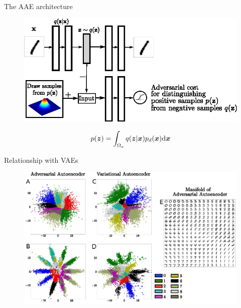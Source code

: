 \documentclass[10pt]{beamer}
\newcommand{\vect}[1]{\boldsymbol{#1}} %
\begin{document}
\begin{frame}{The AAE architecture}
\begin{figure}
  \centering
  \includegraphics[width=0.8\linewidth]{../images/aae-architecture-01.png}
\end{figure}
\[ p(\vect z) = \int_{\Omega_x} q(\vect z | \vect x) p_d(\vect x) \text d \vect x \]
\end{frame}

\begin{frame}{Relationship with VAEs}
\begin{figure}
  \centering
  \includegraphics[width=0.8\linewidth]{../images/aae-embedding-01.png}
\end{figure}
\end{frame}
\end{document}
